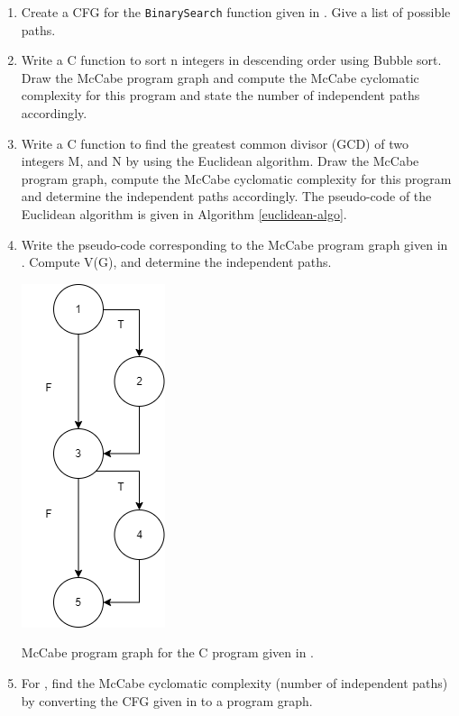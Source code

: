 \begin{enumerate}
    \item Create a CFG for the \lstinline!BinarySearch! function given in . Give a list of possible paths.
    \item Write a C function to sort n integers in descending order using Bubble sort. Draw the McCabe program graph and compute the McCabe cyclomatic complexity for this program and state the number of independent paths accordingly.
    \item Write a C function to find the greatest common divisor (GCD) of two integers M, and N by using the Euclidean algorithm. Draw the McCabe program graph, compute the McCabe cyclomatic complexity for this program and determine the independent paths accordingly.
    The pseudo-code of the Euclidean algorithm is given in Algorithm \ref{euclidean-algo}.
    \item Write the pseudo-code corresponding to the McCabe program graph given in . Compute V(G), and determine the independent paths. 
    
    \begin{marginfigure}
        \includegraphics{images/cfg-35.png}
        \caption{McCabe program graph for the C program given in .}
    \end{marginfigure}
    
    \item For , find the McCabe cyclomatic complexity (number of independent paths) by converting the CFG given in  to a program graph.
\end{enumerate}
